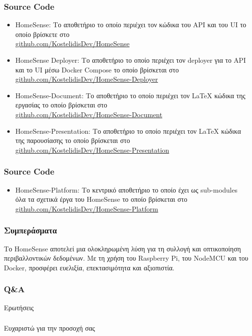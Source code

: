 \documentclass{beamer}
\begin{document}
\begin{frame}
\frametitle{Source Code}
\begin{itemize}
	\item HomeSense: Το αποθετήριο το οποίο περιέχει τον κώδικα του API και του UI το οποίο βρίσκετε στο \\
	\href{https://github.com/KostelidisDev/HomeSense}{github.com/KostelidisDev/HomeSense}
	\item HomeSense Deployer: Το αποθετήριο το οποίο περιέχει τον deployer για το API και το UI μέσω Docker Compose το οποίο βρίσκεται στο \\
	\href{https://github.com/KostelidisDev/HomeSense-Deployer}{github.com/KostelidisDev/HomeSense-Deployer}
	\item HomeSense-Document: Το αποθετήριο το οποίο περιέχει τον LaTeX κώδικα της εργασίας το οποίο βρίσκεται στο \\
	\href{https://github.com/KostelidisDev/HomeSense-Document}{github.com/KostelidisDev/HomeSense-Document}
	\item HomeSense-Presentation: Το αποθετήριο το οποίο περιέχει τον LaTeX κώδικα της παρουσίασης το οποίο βρίσκεται στο \\
	\href{https://github.com/KostelidisDev/HomeSense-Presentation}{github.com/KostelidisDev/HomeSense-Presentation}
\end{itemize}
\end{frame}

\begin{frame}
\frametitle{Source Code}
\begin{itemize}
	\item HomeSense-Platform: Το κεντρικό αποθετήριο το οποίο έχει ως sub-modules όλα τα σχετικά έργα του HomeSense το οποίο βρίσκεται στο \\
	\href{https://github.com/KostelidisDev/HomeSense-Platform}{github.com/KostelidisDev/HomeSense-Platform}
\end{itemize}
\end{frame}

\begin{frame}
\frametitle{Συμπεράσματα}
Το HomeSense αποτελεί μια ολοκληρωμένη λύση για τη συλλογή και οπτικοποίηση περιβαλλοντικών δεδομένων. 
Με τη χρήση του Raspberry Pi, του NodeMCU και του Docker, προσφέρει ευελιξία, επεκτασιμότητα και αξιοπιστία.
\end{frame}

\begin{frame}
\frametitle{Q\&A}
Ερωτήσεις
\end{frame}

\begin{frame}
\frametitle{}
Ευχαριστώ για την προσοχή σας
\end{frame}
\end{document}
